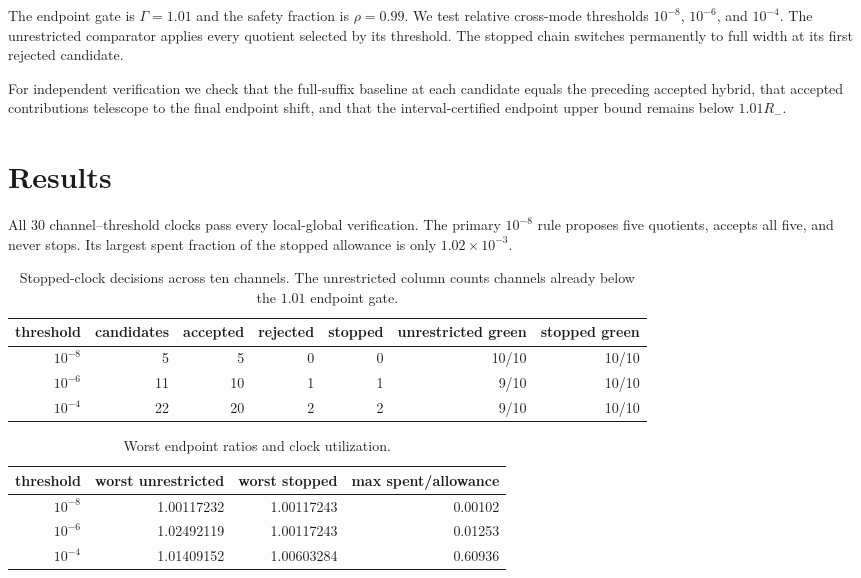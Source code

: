\documentclass[11pt]{article}
\theoremstyle{definition}
\theoremstyle{remark}
\begin{document}
The endpoint gate is $\Gamma=1.01$ and the safety fraction is $\rho=0.99$.
We test relative cross-mode thresholds $10^{-8}$, $10^{-6}$, and $10^{-4}$.
The unrestricted comparator applies every quotient selected by its threshold.
The stopped chain switches permanently to full width at its first rejected
candidate.

For independent verification we check that the full-suffix baseline at each
candidate equals the preceding accepted hybrid, that accepted contributions
telescope to the final endpoint shift, and that the interval-certified
endpoint upper bound remains below $1.01R_-$.

\section{Results}
\label{sec:results}

All 30 channel--threshold clocks pass every local-global verification.  The
primary $10^{-8}$ rule proposes five quotients, accepts all five, and never
stops.  Its largest spent fraction of the stopped allowance is only
$1.02\times10^{-3}$.

\begin{table}[t]
\centering
\caption{Stopped-clock decisions across ten channels.  The unrestricted
column counts channels already below the $1.01$ endpoint gate.}
\label{tab:decisions}
\begin{tabular}{@{}rrrrrrr@{}}
\toprule
threshold & candidates & accepted & rejected & stopped & unrestricted green & stopped green\\
\midrule
$10^{-8}$ & 5  & 5  & 0 & 0 & 10/10 & 10/10\\
$10^{-6}$ & 11 & 10 & 1 & 1 & 9/10  & 10/10\\
$10^{-4}$ & 22 & 20 & 2 & 2 & 9/10  & 10/10\\
\bottomrule
\end{tabular}
\end{table}

\begin{table}[t]
\centering
\caption{Worst endpoint ratios and clock utilization.}
\label{tab:endpoints}
\begin{tabular}{@{}rrrr@{}}
\toprule
threshold & worst unrestricted & worst stopped & max spent/allowance\\
\midrule
$10^{-8}$ & 1.00117232 & 1.00117243 & 0.00102\\
$10^{-6}$ & 1.02492119 & 1.00117243 & 0.01253\\
$10^{-4}$ & 1.01409152 & 1.00603284 & 0.60936\\
\bottomrule
\end{tabular}
\end{table}
\end{document}
